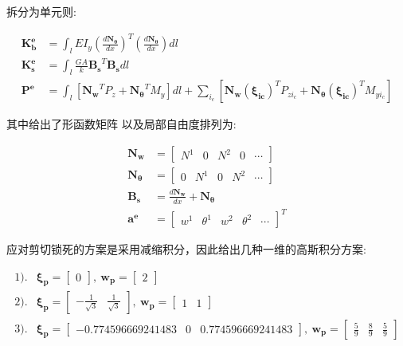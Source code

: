 \documentclass[UTF8,c5size]{ctexart}
\begin{document}
拆分为单元则:

\begin{equation}
    \begin{split}
        \bm{K_b^e}&=\int_{l}{EI_y\left(\frac{d\bm{N_\theta}}{dx}\right)^T\left(\frac{d\bm{N_\theta}}{dx}\right)dl}\\
        \bm{K_s^e}&=\int_{l}{\frac{GA}{k}\bm{B_s}^T\bm{B_s}dl}\\
        \bm{P^e}&=\int_{l}{\left[
            \bm{N_w}^TP_z+\bm{N_\theta}^TM_y
            \right]dl}+
            \sum_{i_c}{\left[
                \bm{N_w(\xi_{ic})}^TP_{zi_c}+\bm{N_\theta(\xi_{ic})}^TM_{yi_c}
            \right]}
    \end{split}
\end{equation}

其中给出了形函数矩阵
以及局部自由度排列为:

\begin{equation}
    \begin{split}
        \bm{N_w}&=
        \begin{bmatrix}
            N^1&0&N^2&0&\dotsb
        \end{bmatrix}\\
        \bm{N_\theta}&=
        \begin{bmatrix}
            0&N^1&0&N^2&\dotsb
        \end{bmatrix}\\
        \bm{B_s}&=\frac{d\bm{N_w}}{dx}+\bm{N_\theta}\\
        \bm{a^e}&=
        \begin{bmatrix}
            w^1&\theta^1&w^2&\theta^2&\dotsb
        \end{bmatrix}^T
    \end{split}
\end{equation}

应对剪切锁死的方案是采用减缩积分，因此给出几种一维的高斯积分方案:

\begin{equation}
    \begin{split}
        1).& \bm{\xi_p}=\begin{bmatrix}
            0
        \end{bmatrix}, \ 
        \bm{w_p}=\begin{bmatrix}
            2
        \end{bmatrix}
        \\ 2).& \bm{\xi_p}=\begin{bmatrix}
            -\frac{1}{\sqrt{3}}&\frac{1}{\sqrt{3}}
        \end{bmatrix}, \ 
        \bm{w_p}=\begin{bmatrix}
            1&1
        \end{bmatrix}
        \\ 3).& \bm{\xi_p}=\begin{bmatrix}
            -0.774596669241483&0&0.774596669241483
        \end{bmatrix}, \ 
        \bm{w_p}=\begin{bmatrix}
            \frac{5}{9}&\frac{8}{9}&\frac{5}{9}
        \end{bmatrix}
    \end{split}
\end{equation}
\end{document}
